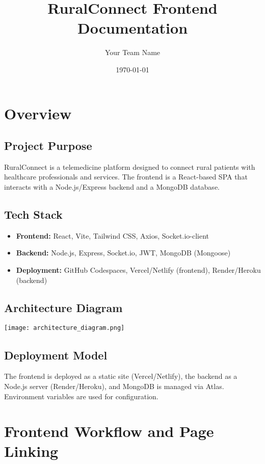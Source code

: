 \documentclass{article}
\title{RuralConnect Frontend Documentation}
\author{Your Team Name}
\date{\today}
\begin{document}
\maketitle

\tableofcontents
\newpage

\section{Overview}
\subsection{Project Purpose}
RuralConnect is a telemedicine platform designed to connect rural patients with healthcare professionals and services. The frontend is a React-based SPA that interacts with a Node.js/Express backend and a MongoDB database.

\subsection{Tech Stack}
\begin{itemize}
  \item \textbf{Frontend:} React, Vite, Tailwind CSS, Axios, Socket.io-client
  \item \textbf{Backend:} Node.js, Express, Socket.io, JWT, MongoDB (Mongoose)
  \item \textbf{Deployment:} GitHub Codespaces, Vercel/Netlify (frontend), Render/Heroku (backend)
\end{itemize}

\subsection{Architecture Diagram}
\begin{center}
  \texttt{[image: architecture\_diagram.png]}
\end{center}

\subsection{Deployment Model}
The frontend is deployed as a static site (Vercel/Netlify), the backend as a Node.js server (Render/Heroku), and MongoDB is managed via Atlas. Environment variables are used for configuration.

\section{Frontend Workflow and Page Linking}
\end{document}

